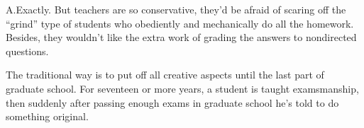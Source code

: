 {{{{{{{{\item{A.}Exactly. But teachers are so conservative, they'd be
afraid of scaring off the ``grind'' type of students who
obediently and mechanically do all the homework. Besides, they
wouldn't like the extra work of grading the answers to
nondirected questions.

\item{}The traditional way is to put off all creative aspects
until the last part of graduate school. For seventeen or more
years, a student is taught exams\-man\-ship, then suddenly after
passing enough exams in graduate school he's told to do
something original.
}
\def\\#1{\raise.5pt\hbox{$\scriptscriptstyle
    \ifx#1`\langle\!\langle\else\rangle\!\rangle\fi$}%
  \ifx#1`\nobreak\hskip0pt \fi} %
\def\secondcol{ %
\item{A.} \strut La parte creativa es mucho mejor que la deductiva.
En vez de concentrarse en buscar buenas respuestas a ciertas
cuestiones es m\'as importante aprender a proponerse buenas
preguntas.

\item{B.} Me parece una buena ocurrencia. Me gustar\'\i a
que los profesores propusieran problemas del estilo de
\\`Encuentren algo interesante sobre $x$\\' en vez de
\\`Demuestre que $x\ldots\,$\\'.

\item{A.} Exactamente. Pero los profesores son tan conservadores
que temer\'\i an espantar al tipo de estudiante \\`apisonadora\\'
que hace lo que le proponen para casa, obe\-dien\-te\-mente y de forma
mec\'anica. Adem\'as, no creo que les gustase el trabajo adicional
de calificar respuestas a preguntas abiertas.

}}}}}}}}

